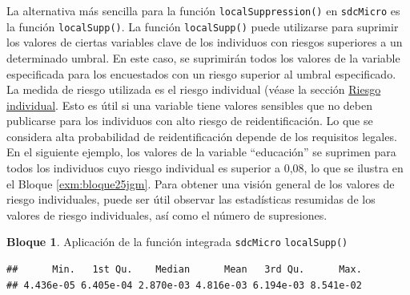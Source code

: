\documentclass[]{book}
\newenvironment{Shaded}{\begin{snugshade}}{\end{snugshade}}
\newcommand{\CommentTok}[1]{\textcolor[rgb]{0.56,0.35,0.01}{\textit{#1}}}
\newcommand{\DecValTok}[1]{\textcolor[rgb]{0.00,0.00,0.81}{#1}}
\newcommand{\FloatTok}[1]{\textcolor[rgb]{0.00,0.00,0.81}{#1}}
\newcommand{\KeywordTok}[1]{\textcolor[rgb]{0.13,0.29,0.53}{\textbf{#1}}}
\newcommand{\NormalTok}[1]{#1}
\newcommand{\OperatorTok}[1]{\textcolor[rgb]{0.81,0.36,0.00}{\textbf{#1}}}
\newcommand{\StringTok}[1]{\textcolor[rgb]{0.31,0.60,0.02}{#1}}
\theoremstyle{definition}
\theoremstyle{definition}
\newtheorem{example}{Bloque}[chapter]
\theoremstyle{definition}
\theoremstyle{definition}
\theoremstyle{remark}
\begin{document}
La alternativa más sencilla para la función \texttt{localSuppression()} en \texttt{sdcMicro} es la función \texttt{localSupp()}. La función \texttt{localSupp()} puede utilizarse para suprimir los valores de ciertas variables clave de los individuos con riesgos superiores a un determinado umbral. En este caso, se suprimirán todos los valores de la variable especificada para los encuestados con un riesgo superior al umbral especificado. La medida de riesgo utilizada es el riesgo individual (véase la sección \protect\hyperlink{riesgo-individual}{Riesgo individual}. Esto es útil si una variable tiene valores sensibles que no deben publicarse para los individuos con alto riesgo de reidentificación. Lo que se considera alta probabilidad de reidentificación depende de los requisitos legales. En el siguiente ejemplo, los valores de la variable ``educación'' se suprimen para todos los individuos cuyo riesgo individual es superior a 0,08, lo que se ilustra en el Bloque \ref{exm:bloque25jgm}. Para obtener una visión general de los valores de riesgo individuales, puede ser útil observar las estadísticas resumidas de los valores de riesgo individuales, así como el número de supresiones.

\begin{example}
\protect\hypertarget{exm:bloque25jgm}{}{\label{exm:bloque25jgm} }Aplicación de la función integrada \texttt{sdcMicro} \texttt{localSupp()}
\end{example}

\begin{Shaded}
\end{Shaded}

\begin{verbatim}
##      Min.   1st Qu.    Median      Mean   3rd Qu.      Max. 
## 4.436e-05 6.405e-04 2.870e-03 4.816e-03 6.194e-03 8.541e-02
\end{verbatim}

\begin{Shaded}
\end{Shaded}
\end{document}
